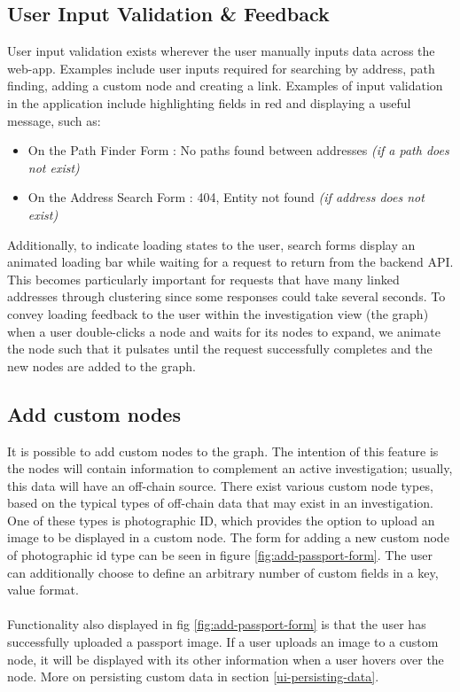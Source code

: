 \subsection{User Input Validation \& Feedback}
User input validation exists wherever the user manually inputs data across the web-app. Examples include user inputs required for searching by address, path finding, adding a custom node and creating a link. Examples of input validation in the application include highlighting fields in red and displaying a useful message, such as:
\begin{itemize}
    \item On the Path Finder Form : No paths found between addresses \textit{(if a path does not exist)}
    \item On the Address Search Form : 404, Entity not found \textit{(if address does not exist)}
\end{itemize}

Additionally, to indicate loading states to the user, search forms display an animated loading bar while waiting for a request to return from the backend API. This becomes particularly important for requests that have many linked addresses through clustering since some responses could take several seconds. To convey loading feedback to the user within the investigation view (the graph) when a user double-clicks a node and waits for its nodes to expand, we animate the node such that it pulsates until the request successfully completes and the new nodes are added to the graph. 

\subsection{Add custom nodes}
It is possible to add custom nodes to the graph. The intention of this feature is the nodes will contain information to complement an active investigation; usually, this data will have an off-chain source. There exist various custom node types, based on the typical types of off-chain data that may exist in an investigation. One of these types is photographic ID, which provides the option to upload an image to be displayed in a custom node. The form for adding a new custom node of photographic id type can be seen in figure \ref{fig:add-passport-form}. The user can additionally choose to define an arbitrary number of custom fields in a key, value format. 
\\\\
Functionality also displayed in fig \ref{fig:add-passport-form} is that the user has successfully uploaded a passport image.  If a user uploads an image to a custom node, it will be displayed with its other information when a user hovers over the node. More on persisting custom data in section \ref{ui-persisting-data}.


